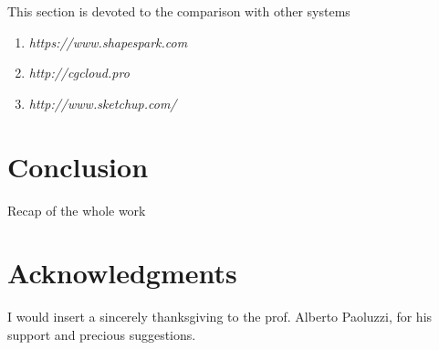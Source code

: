 \documentclass{sigchi}
\begin{document}
This section is devoted to the comparison with other systems

\begin{enumerate}
  \item \em{https://www.shapespark.com}
  \item \em{http://cgcloud.pro}
  \item \em{http://www.sketchup.com/}
\end{enumerate}



\section{Conclusion}  %
\label{sec:conclusion}

Recap of the whole work



\section{Acknowledgments}  %
\label{sec:acknowledgments}

I would insert a sincerely thanksgiving to the prof. Alberto Paoluzzi, for his support and precious suggestions.


%
%
%
%
%
\balance



\end{document}
